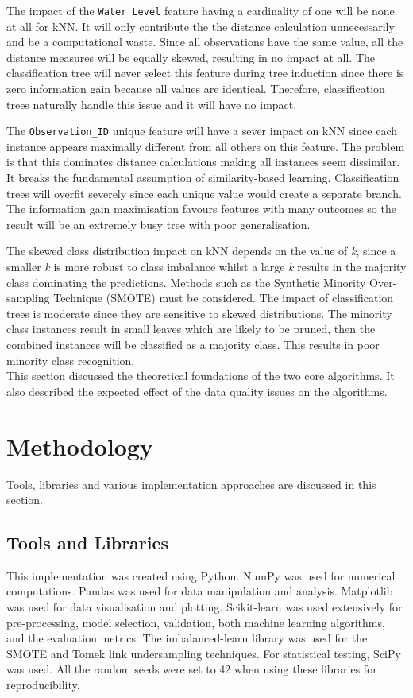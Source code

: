 \documentclass[10pt, conference]{IEEEtran}
\begin{document}
The impact of the \texttt{Water\_Level} feature having a cardinality of one will be none at all for kNN. It will only contribute the the distance calculation unnecessarily and be a computational waste. Since all observations have the same value, all the distance measures will be equally skewed, resulting in no impact at all. The classification tree will never select this feature during tree induction since there is zero information gain because all values are identical. Therefore, classification trees naturally handle this issue and it will have no impact.

The \texttt{Observation\_ID} unique feature will have a sever impact on kNN since each instance appears maximally different from all others on this feature. The problem is that this dominates distance calculations making all instances seem dissimilar. It breaks the fundamental assumption of similarity-based learning. Classification trees will overfit severely since each unique value would create a separate branch. The information gain maximisation favours features with many outcomes so the result will be an extremely busy tree with poor generalisation.

The skewed class distribution impact on kNN depends on the value of \textit{k}, since a smaller \textit{k} is more robust to class imbalance whilst a large \textit{k} results in the majority class dominating the predictions. Methods such as the Synthetic Minority Over-sampling Technique (SMOTE) must be considered. The impact of classification trees is moderate since they are sensitive to skewed distributions. The minority class instances result in small leaves which are likely to be pruned, then the combined instances will be classified as a majority class. This results in poor minority class recognition. \\

This section discussed the theoretical foundations of the two core algorithms. It also described the expected effect of the data quality issues on the algorithms.

\section{Methodology}
Tools, libraries and various implementation approaches are discussed in this section.
\subsection{Tools and Libraries}
This implementation was created using Python. NumPy\cite{harris2020array} was used for numerical computations. Pandas\cite{reback2020pandas} was used for data manipulation and analysis. Matplotlib\cite{Hunter:2007} was used for data visualisation and plotting. Scikit-learn\cite{scikit-learn} was used extensively for pre-processing, model selection, validation, both machine learning algorithms, and the evaluation metrics. The imbalanced-learn library\cite{JMLR:v18:16-365} was used for the SMOTE and Tomek link undersampling techniques. For statistical testing, SciPy\cite{2020SciPy-NMeth} was used. All the random seeds were set to 42 when using these libraries for reproducibility.
\end{document}
